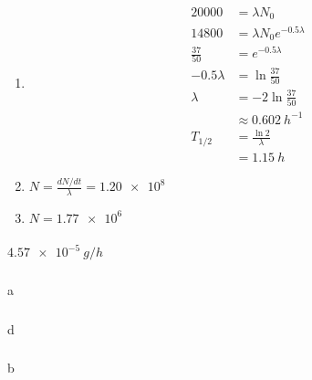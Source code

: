 \documentclass{article}
\begin{document}
\begin{enumerate}
  \item

        \begin{align*}
          \num{20000}   & = \lambda N_0                  \\
          \num{14800}   & = \lambda N_0 e^{-0.5 \lambda} \\
          \frac{37}{50} & = e^{-0.5 \lambda}             \\
          -0.5 \lambda  & = \ln \frac{37}{50}            \\
          \lambda       & = -2 \ln \frac{37}{50}         \\
                        & \approx \qty{0.602}{h^{-1}}    \\
          T_{1 / 2}     & = \frac{\ln 2}{\lambda}        \\
                        & = \qty{1.15}{h}
        \end{align*}

  \item $N = \frac{d N / d t}{\lambda} = \num{1.20e8}$

  \item $N = \num{1.77e6}$
\end{enumerate}

\setcounter{subsubsection}{70}
\subsubsection{}

$\qty{4.57e-5}{g/h}$

\setcounter{subsubsection}{72}
\subsubsection{}

a

\setcounter{subsubsection}{74}
\subsubsection{}

d

\setcounter{subsubsection}{76}
\subsubsection{}

b
\end{document}

